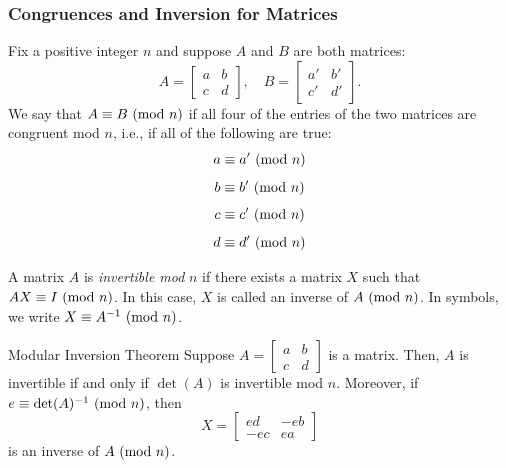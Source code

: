 \documentclass[letterpaper]{article}
\newcommand{\0}{\mathbf{0}}
\begin{document}
\subsubsection{Congruences and Inversion for Matrices}
\begin{definition}{}{}
    Fix a positive integer $n$ and suppose $A$ and $B$ are both matrices: 
    \[A = \begin{bmatrix}
        a & b \\ c & d
    \end{bmatrix}, \quad B = \begin{bmatrix}
        a' & b' \\ c' & d'
    \end{bmatrix}.\] We say that $A \equiv B \ (\mathrm{mod}\ n)$ if all four of the entries of the two matrices are congruent mod $n$, i.e., if all of the following are true:  
    \[a \equiv a' \ (\mathrm{mod}\ n)\] 
    \[b \equiv b' \ (\mathrm{mod}\ n)\] 
    \[c \equiv c' \ (\mathrm{mod}\ n)\]
    \[d \equiv d' \ (\mathrm{mod}\ n)\]
\end{definition}

\begin{definition}{}{}
    A matrix $A$ is \emph{invertible mod} $n$ if there exists a matrix $X$ such that $AX \equiv I \ (\mathrm{mod}\ n)$. In this case, $X$ is called an inverse of $A \ (\mathrm{mod}\ n)$. In symbols, we write $X \equiv A^{-1} \ (\mathrm{mod}\ n)$. 
\end{definition}

\begin{theorem}{Modular Inversion Theorem}{}
    Suppose $A = \begin{bmatrix}
        a & b \\ c & d
    \end{bmatrix}$ is a matrix. Then, $A$ is invertible if and only if $\det(A)$ is invertible mod $n$. Moreover, if $e \equiv \det(A)^{-1} \ (\mathrm{mod}\ n)$, then \[X = \begin{bmatrix}
        ed & -eb \\ 
        -ec & ea
    \end{bmatrix}\] is an inverse of $A \ (\mathrm{mod}\ n)$. 
\end{theorem}
\end{document}
